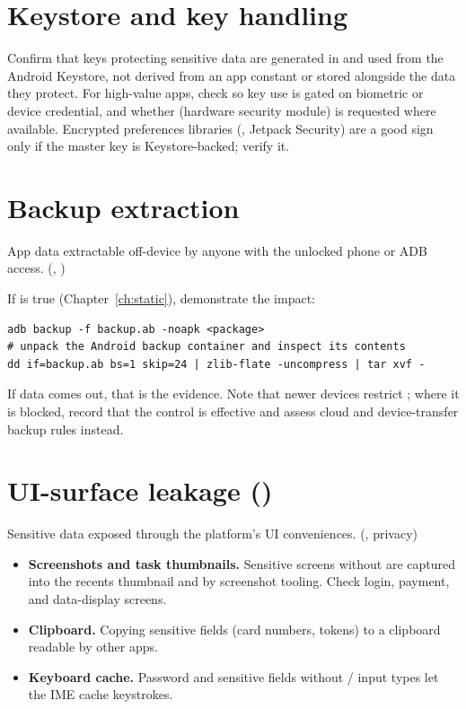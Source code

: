 \section{Keystore and key handling}
Confirm that keys protecting sensitive data are generated in and used from the Android Keystore, not derived from an app constant or stored alongside the data they protect. For high-value apps, check  so key use is gated on biometric or device credential, and whether  (hardware security module) is requested where available. Encrypted preferences libraries (, Jetpack Security) are a good sign only if the master key is Keystore-backed; verify it.

\section{Backup extraction}
\begin{findingbox}
App data extractable off-device by anyone with the unlocked phone or ADB access. (, )
\end{findingbox}
If  is true (Chapter~\ref{ch:static}), demonstrate the impact:

\begin{lstlisting}
adb backup -f backup.ab -noapk <package>
# unpack the Android backup container and inspect its contents
dd if=backup.ab bs=1 skip=24 | zlib-flate -uncompress | tar xvf -
\end{lstlisting}

If data comes out, that is the evidence. Note that newer devices restrict ; where it is blocked, record that the control is effective and assess cloud and device-transfer backup rules instead.

\section{UI-surface leakage ()}
\begin{findingbox}
Sensitive data exposed through the platform's UI conveniences. (, privacy)
\end{findingbox}

\begin{itemize}
\item \textbf{Screenshots and task thumbnails.} Sensitive screens without  are captured into the recents thumbnail and by screenshot tooling. Check login, payment, and data-display screens.
\item \textbf{Clipboard.} Copying sensitive fields (card numbers, tokens) to a clipboard readable by other apps.
\item \textbf{Keyboard cache.} Password and sensitive fields without / input types let the IME cache keystrokes.
\end{itemize}

